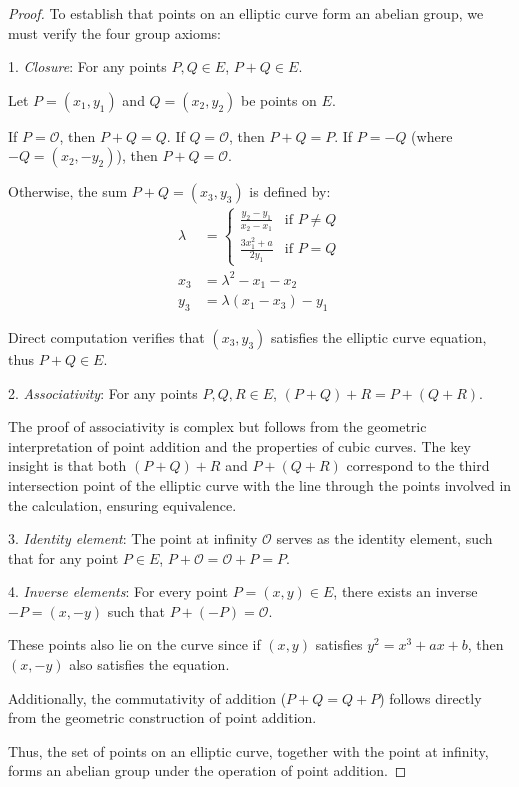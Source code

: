 \documentclass[12pt,a4paper]{article}
\theoremstyle{definition}
\begin{document}
\begin{proof}
To establish that points on an elliptic curve form an abelian group, we must verify the four group axioms:

1. \textit{Closure}: For any points $P, Q \in E$, $P + Q \in E$.

Let $P = (x_1, y_1)$ and $Q = (x_2, y_2)$ be points on $E$.

If $P = \mathcal{O}$, then $P + Q = Q$.
If $Q = \mathcal{O}$, then $P + Q = P$.
If $P = -Q$ (where $-Q = (x_2, -y_2)$), then $P + Q = \mathcal{O}$.

Otherwise, the sum $P + Q = (x_3, y_3)$ is defined by:
\begin{align}
\lambda &= 
\begin{cases} 
\frac{y_2 - y_1}{x_2 - x_1} & \text{if } P \neq Q \\
\frac{3x_1^2 + a}{2y_1} & \text{if } P = Q
\end{cases} \\
x_3 &= \lambda^2 - x_1 - x_2 \\
y_3 &= \lambda(x_1 - x_3) - y_1
\end{align}

Direct computation verifies that $(x_3, y_3)$ satisfies the elliptic curve equation, thus $P + Q \in E$.

2. \textit{Associativity}: For any points $P, Q, R \in E$, $(P + Q) + R = P + (Q + R)$.

The proof of associativity is complex but follows from the geometric interpretation of point addition and the properties of cubic curves. The key insight is that both $(P + Q) + R$ and $P + (Q + R)$ correspond to the third intersection point of the elliptic curve with the line through the points involved in the calculation, ensuring equivalence.

3. \textit{Identity element}: The point at infinity $\mathcal{O}$ serves as the identity element, such that for any point $P \in E$, $P + \mathcal{O} = \mathcal{O} + P = P$.

4. \textit{Inverse elements}: For every point $P = (x, y) \in E$, there exists an inverse $-P = (x, -y)$ such that $P + (-P) = \mathcal{O}$.

These points also lie on the curve since if $(x, y)$ satisfies $y^2 = x^3 + ax + b$, then $(x, -y)$ also satisfies the equation.

Additionally, the commutativity of addition ($P + Q = Q + P$) follows directly from the geometric construction of point addition.

Thus, the set of points on an elliptic curve, together with the point at infinity, forms an abelian group under the operation of point addition.
\end{proof}
\end{document}
